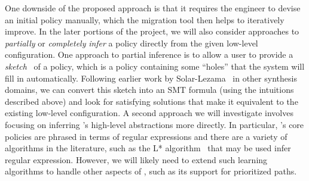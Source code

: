 
One downside of the proposed approach is that it requires the engineer
to devise an initial \Name policy manually, which the migration tool
then helps to iteratively improve.  In the later portions of the project, 
we will also consider approaches to \emph{partially} or 
\emph{completely} {\em infer} a \Name policy directly from the given
low-level configuration.  One approach to partial inference is
to allow a user to provide a \emph{sketch}~\cite{sketch} of a policy,
which is a policy containing some ``holes'' that the system will fill in
automatically.  Following earlier work by Solar-Lezama~\cite{sketch}
in other synthesis domains, we can convert this sketch into an SMT formula
(using the intuitions described above)
and look for satisfying solutions that make it equivalent to 
the existing low-level configuration.
A second approach we will investigate involves focusing on inferring \Name's
high-level abstractions more directly.  In particular, \Name's core policies are
phrased in terms of regular expressions and there are a variety of algorithms
in the literature, such as the L* algorithm~\cite{} that may be used
infer regular expression.
However, we will likely need to extend such
learning algorithms to handle other aspects of \Name, such as its
support for prioritized paths.

